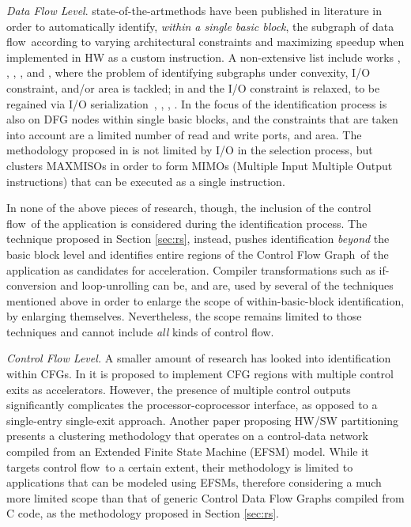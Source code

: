 \documentclass[]{usiinfthesis}
\newcommand{\SoTA}{{state-of-the-art}}
\newcommand{\dataflow}{data flow}
\newcommand{\controlflow}{control flow}
\newcommand{\CFG}{Control Flow Graph}
\begin{document}
\emph{Data Flow Level}.
\SoTA methods have been
published in literature in order to automatically identify,
\emph{within a single basic block}, the subgraph of \dataflow\ 
according to varying architectural constraints and maximizing speedup
when implemented in HW as a custom instruction. A non-extensive list
include works \cite{YuSep04}, \cite{PozziJul06}, \cite{ChenFeb07},
\cite{ReddingtonAug09}, \cite{GiaquintaMar15} and \cite{MartiFeb12},
where the problem of identifying subgraphs under convexity, I/O
constraint, and/or area is tackled; in \cite{VermaOct07} and
\cite{PothineniJan07} the I/O constraint is relaxed, to be regained
via I/O serialization~\cite{PozziSep05}, \cite{VermaOct07},
\cite{AtasuApr07}, \cite{AhnJan13}. In \cite{CongFeb04} the focus of
the identification process is also on DFG nodes within single basic
blocks, and the constraints that are taken into account are a limited
number of read and write ports, and area.  The methodology proposed in
\cite{GaluzziOct06} is not limited by I/O in the selection process,
but clusters MAXMISOs \cite{AlippiMar99} in order to form MIMOs 
(Multiple Input Multiple Output instructions) that can be executed as 
a single instruction.\par

In none of the above pieces of research, though, the inclusion of the
\controlflow\ of the application is considered during the
identification process. The technique proposed in Section \ref{sec:rs}, 
instead, pushes 
identification \emph{beyond} the basic block level and identifies 
entire regions of the \CFG\ of the
application as candidates for acceleration. Compiler
transformations such as if-conversion and loop-unrolling can be, and
are, used by several of the techniques mentioned above in order to
enlarge the scope of within-basic-block identification, by enlarging 
themselves. Nevertheless, the scope remains limited to those
techniques and cannot include \emph{all} kinds of
\controlflow.\par

\emph{Control Flow Level.}
A smaller amount of research has looked into
identification within CFGs. In \cite{ZuluagaJul09} it is
proposed to implement CFG regions with multiple control exits as
accelerators. However, the presence of multiple control outputs
significantly complicates the processor-coprocessor interface, as
opposed to a single-entry single-exit approach. 
Another paper proposing HW/SW partitioning~\cite{BaleaniMay02}
presents a clustering methodology that operates on a control-data
network compiled from an Extended Finite State Machine (EFSM)
model. While it targets \controlflow\ to a certain extent, their
methodology is limited to applications that can be modeled using
EFSMs, therefore considering a much more limited scope than that of
generic Control Data Flow Graphs compiled from C code, as the methodology
proposed in Section \ref{sec:rs}.
\end{document}
